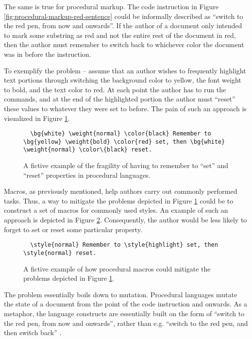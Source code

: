 \documentclass{scrreprt}
\begin{document}
The same is true for procedural markup. The code instruction in Figure \ref{fig:procedural-markup-red-sentence} could be informally described as ``switch to the red pen, from now and onwards''. If the author of a document only intended to mark some substring as red and not the entire rest of the document in red, then the author must remember to switch back to whichever color the document was in before the instruction.

To exemplify the problem -- assume that an author wishes to frequently highlight text portions through switching the background color to yellow, the font weight to bold, and the text color to red. At each point the author has to run the commands, and at the end of the highlighted portion the author must ``reset'' these values to whatever they were set to before. The pain of such an approach is visualized in Figure \ref{fig:procedural-markup-set-reset}.


\begin{figure}[h]
\begin{lstlisting}
  \bg{white} \weight{normal} \color{black} Remember to \bg{yellow} \weight{bold} \color{red} set, then \bg{white} \weight{normal} \color\{black} reset.
\end{lstlisting}
\caption{A fictive example of the fragility of having to remember to ``set'' and ``reset'' properties in procedural languages.}
\label{fig:procedural-markup-set-reset}
\end{figure}


Macros, as previously mentioned, help authors carry out commonly performed tasks. Thus, a way to mitigate the problems depicted in Figure \ref{fig:procedural-markup-set-reset} could be to construct a set of macros for commonly used styles. An example of such an approach is depicted in Figure \ref{fig:procedural-markup-set-reset-macro}. Consequently, the author would be less likely to forget to set or reset some particular property.


\begin{figure}[h]
\begin{lstlisting}
  \style{normal} Remember to \style{highlight} set, then \style{normal} reset.
\end{lstlisting}
\caption{A fictive example of how procedural macros could mitigate the problems depicted in Figure \ref{fig:procedural-markup-set-reset}.}
\label{fig:procedural-markup-set-reset-macro}
\end{figure}


The problem essentially boils down to mutation. Procedural languages mutate the state of a document from the point of the code instruction and onwards. As a metaphor, the language constructs are essentially built on the form of ``switch to the red pen, from now and onwards'', rather than e.g. ``switch to the red pen, and then switch back'' .
\end{document}
